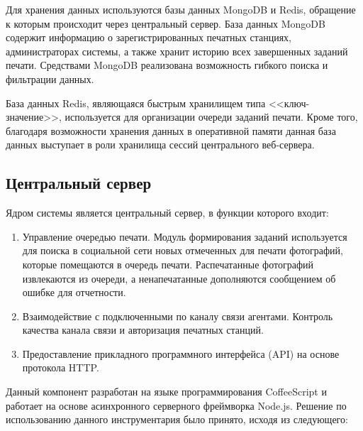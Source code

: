 \documentclass[a4paper,14pt,href]{article}
\begin{document}
Для хранения данных используются базы данных MongoDB и Redis, обращение к которым происходит через центральный сервер.
База данных MongoDB содержит информацию о зарегистрированных печатных станциях, администраторах системы, а также хранит
историю всех завершенных заданий печати. Средствами MongoDB реализована возможность гибкого поиска и
фильтрации данных\cite{MongoDBBook}.

База данных Redis, являющаяся быстрым хранилищем типа <<ключ-значение>>, используется для организации очереди
заданий печати. Кроме того, благодаря возможности хранения данных в оперативной памяти данная база данных выступает в
роли хранилища сессий центрального веб-сервера.

\subsection{Центральный сервер}
Ядром системы является центральный сервер, в функции которого входит:

\begin{enumerate}
  \item Управление очередью печати. Модуль формирования заданий используется для поиска в социальной сети новых
  отмеченных для печати фотографий, которые помещаются в очередь печати. Распечатанные фотографий извлекаются из
  очереди, а ненапечатанные дополняются сообщением об ошибке для отчетности.

  \item Взаимодействие с подключенными по каналу связи агентами. Контроль качества канала связи и авторизация
  печатных станций.

  \item Предоставление прикладного программного интерфейса (API) на основе протокола HTTP.
\end{enumerate}

Данный компонент разработан на языке программирования \linebreak CoffeeScript\cite{LittleCoffeeScript} и работает
на основе асинхронного серверного фреймворка Node.js. Решение по использованию данного инструментария было принято,
исходя из следующего:
\end{document}
